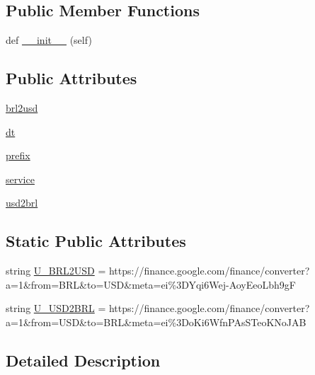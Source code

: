 \subsection*{Public Member Functions}
\begin{DoxyCompactItemize}
\item 
def \hyperlink{classrates_1_1_google_a6d9d023db3b4f6f2b585397e3469c396}{\+\_\+\+\_\+init\+\_\+\+\_\+} (self)
\end{DoxyCompactItemize}
\subsection*{Public Attributes}
\begin{DoxyCompactItemize}
\item 
\hyperlink{classrates_1_1_google_a0979ffcb18b8bf3156cc5735c67ca6df}{brl2usd}
\item 
\hyperlink{classrates_1_1_google_a76574be36237f78780f76bed53e69ab2}{dt}
\item 
\hyperlink{classrates_1_1_google_ada5de8700ad571d0ab819fa0163d6bbe}{prefix}
\item 
\hyperlink{classrates_1_1_google_a1da08e36d5007aa5293d048b625a35e9}{service}
\item 
\hyperlink{classrates_1_1_google_a94c28f6d60d5d6afc075416d7378471c}{usd2brl}
\end{DoxyCompactItemize}
\subsection*{Static Public Attributes}
\begin{DoxyCompactItemize}
\item 
string \hyperlink{classrates_1_1_google_a46dbc3fa0a110bf5b66808c29642cfa1}{U\+\_\+\+B\+R\+L2\+U\+SD} = \textquotesingle{}https\+://finance.\+google.\+com/finance/converter?a=1\&from=B\+RL\&to=U\+SD\&meta=ei\%3\+D\+Yqi6\+Wej-\/\+Aoy\+Eeo\+Lbh9g\+F\textquotesingle{}
\item 
string \hyperlink{classrates_1_1_google_a77ef7f5932c48b002697fb187a234d4a}{U\+\_\+\+U\+S\+D2\+B\+RL} = \textquotesingle{}https\+://finance.\+google.\+com/finance/converter?a=1\&from=U\+SD\&to=B\+RL\&meta=ei\%3\+Do\+Ki6\+Wfn\+P\+As\+S\+Teo\+K\+No\+J\+A\+B\textquotesingle{}
\end{DoxyCompactItemize}


\subsection{Detailed Description}


